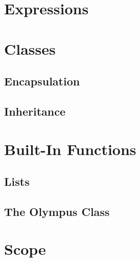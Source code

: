 \documentclass{article}
\begin{document}
\section{Expressions}


\section{Classes}

\subsection{Encapsulation}

\subsection{Inheritance}



\section{Built-In Functions}

\subsection{Lists}

\subsection{The Olympus Class}

\section{Scope}
\end{document}
